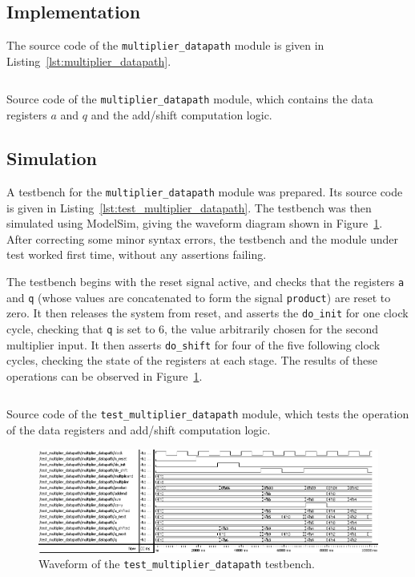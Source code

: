 \documentclass[a4paper]{article}
\newcommand{\modulelisting}[3]{
  \begin{listing}[p]
    \linespread{.9}\inputminted[fontsize=\scriptsize,linenos]{systemverilog}{#2}
    \centering\caption{#3}
    \label{lst:#1}
  \end{listing}
}
\begin{document}
\subsection{Implementation}
\label{sec:reg:impl}

The source code of the \texttt{multiplier\_datapath} module is given in Listing~\ref{lst:multiplier_datapath}.

\modulelisting{multiplier_datapath}{../src/multiplier/multiplier_datapath.sv}
  {Source code of the \texttt{multiplier\_datapath} module, which contains the data registers $a$ and $q$ and the add/shift computation logic.}

\subsection{Simulation}
\label{sec:reg:sim}

A testbench for the \texttt{multiplier\_datapath} module was prepared. Its source code is given in Listing~\ref{lst:test_multiplier_datapath}. The testbench was then simulated using ModelSim, giving the waveform diagram shown in Figure~\ref{fig:test_multiplier_datapath}. After correcting some minor syntax errors, the testbench and the module under test worked first time, without any assertions failing.

The testbench begins with the reset signal active, and checks that the registers \texttt{a} and \texttt{q} (whose values are concatenated to form the signal \texttt{product}) are reset to zero. It then releases the system from reset, and asserts the \texttt{do\_init} for one clock cycle, checking that \texttt{q} is set to 6, the value arbitrarily chosen for the second multiplier input. It then asserts \texttt{do\_shift} for four of the five following clock cycles, checking the state of the registers at each stage. The results of these operations can be observed in Figure~\ref{fig:test_multiplier_datapath}.

\modulelisting{test_multiplier_datapath}{../src/multiplier/test/test_multiplier_datapath.sv}
  {Source code of the \texttt{test\_multiplier\_datapath} module, which tests the operation of the data registers and add/shift computation logic.}

\begin{figure}[p]
  \centering\includegraphics[width=\textwidth]{assets/test_multiplier_datapath}
  \centering\caption{Waveform of the \texttt{test\_multiplier\_datapath} testbench.}
  \label{fig:test_multiplier_datapath}
\end{figure}
\end{document}
